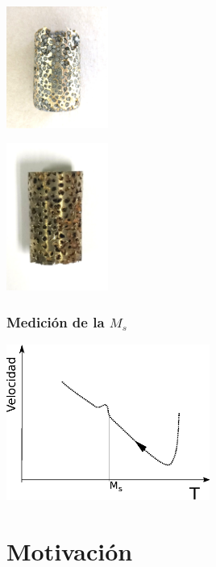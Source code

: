 \documentclass[usenames,dvipsnames]{beamer}
\begin{document}
\begin{frame}
\begin{center}
\begin{multicols}{3}
\includegraphics[width=0.25\textwidth]{img/proceso/proceso2.jpg}

\includegraphics[width=0.25\textwidth]{img/proceso/proceso3.jpg}
\end{multicols}

\end{center}
\end{frame}

\begin{frame}
\frametitle{Medición de la $M_s$}

 \includegraphics[width=0.5\textwidth]{img/proceso/Ms.eps}

\end{frame}





\section{Motivación}
\end{document}
